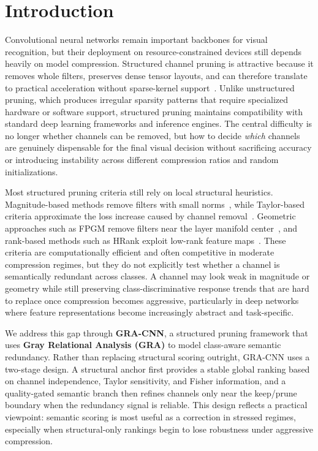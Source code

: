\documentclass[preprint,12pt]{elsarticle}
\begin{document}
\section{Introduction}
\label{sec:introduction}

Convolutional neural networks remain important backbones for visual recognition, but their deployment on resource-constrained devices still depends heavily on model compression. Structured channel pruning is attractive because it removes whole filters, preserves dense tensor layouts, and can therefore translate to practical acceleration without sparse-kernel support~\cite{he2017channel,liu2017network_slimming}. Unlike unstructured pruning, which produces irregular sparsity patterns that require specialized hardware or software support, structured pruning maintains compatibility with standard deep learning frameworks and inference engines. The central difficulty is no longer whether channels can be removed, but how to decide \emph{which} channels are genuinely dispensable for the final visual decision without sacrificing accuracy or introducing instability across different compression ratios and random initializations.

Most structured pruning criteria still rely on local structural heuristics. Magnitude-based methods remove filters with small norms~\cite{li2017pruning}, while Taylor-based criteria approximate the loss increase caused by channel removal~\cite{molchanov2019taylor}. Geometric approaches such as FPGM remove filters near the layer manifold center~\cite{he2019fpgm}, and rank-based methods such as HRank exploit low-rank feature maps~\cite{lin2020hrank}. These criteria are computationally efficient and often competitive in moderate compression regimes, but they do not explicitly test whether a channel is semantically redundant across classes. A channel may look weak in magnitude or geometry while still preserving class-discriminative response trends that are hard to replace once compression becomes aggressive, particularly in deep networks where feature representations become increasingly abstract and task-specific.

We address this gap through \textbf{GRA-CNN}, a structured pruning framework that uses \textbf{Gray Relational Analysis (GRA)} to model class-aware semantic redundancy. Rather than replacing structural scoring outright, GRA-CNN uses a two-stage design. A structural anchor first provides a stable global ranking based on channel independence, Taylor sensitivity, and Fisher information, and a quality-gated semantic branch then refines channels only near the keep/prune boundary when the redundancy signal is reliable. This design reflects a practical viewpoint: semantic scoring is most useful as a correction in stressed regimes, especially when structural-only rankings begin to lose robustness under aggressive compression.
\end{document}
